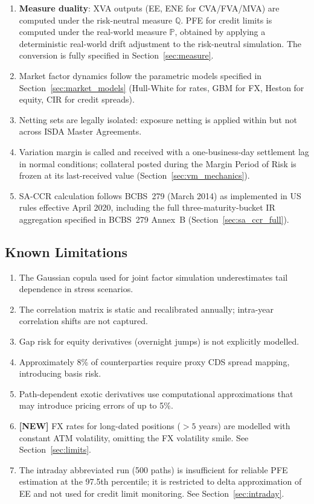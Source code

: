\documentclass[11pt,a4paper]{article}
\begin{document}
\begin{enumerate}[noitemsep]
  \item \textbf{Measure duality}: XVA outputs (EE, ENE for CVA/FVA/MVA) are
        computed under the risk-neutral measure $\mathbb{Q}$. PFE for credit
        limits is computed under the real-world measure $\mathbb{P}$, obtained
        by applying a deterministic real-world drift adjustment to the
        risk-neutral simulation. The conversion is fully specified in
        Section~\ref{sec:measure}.
  \item Market factor dynamics follow the parametric models specified in
        Section~\ref{sec:market_models} (Hull-White for rates, GBM for FX,
        Heston for equity, CIR for credit spreads).
  \item Netting sets are legally isolated: exposure netting is applied within
        but not across ISDA Master Agreements.
  \item Variation margin is called and received with a one-business-day
        settlement lag in normal conditions; collateral posted during the
        Margin Period of Risk is frozen at its last-received value
        (Section~\ref{sec:vm_mechanics}).
  \item SA-CCR calculation follows BCBS~279 (March 2014) as implemented in
        US rules effective April 2020, including the full three-maturity-bucket
        IR aggregation specified in BCBS~279 Annex~B
        (Section~\ref{sec:sa_ccr_full}).
\end{enumerate}

\subsection{Known Limitations}

\begin{enumerate}[noitemsep]
  \item The Gaussian copula used for joint factor simulation underestimates
        tail dependence in stress scenarios.
  \item The correlation matrix is static and recalibrated annually; intra-year
        correlation shifts are not captured.
  \item Gap risk for equity derivatives (overnight jumps) is not explicitly
        modelled.
  \item Approximately 8\% of counterparties require proxy CDS spread mapping,
        introducing basis risk.
  \item Path-dependent exotic derivatives use computational approximations that
        may introduce pricing errors of up to 5\%.
  \item \textbf{[NEW]} FX rates for long-dated positions ($>5$ years) are
        modelled with constant ATM volatility, omitting the FX volatility smile.
        See Section~\ref{sec:limits}.
  \item The intraday abbreviated run (500 paths) is insufficient for reliable
        PFE estimation at the 97.5th percentile; it is restricted to delta
        approximation of EE and not used for credit limit monitoring.
        See Section~\ref{sec:intraday}.
\end{enumerate}
\end{document}
